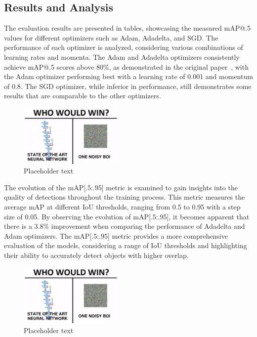 \documentclass[a4paper,12pt]{article}
\begin{document}
\begin{multicols}{2}
\section{Results and Analysis}

The evaluation results are presented in tables, showcasing the measured mAP@.5 values for different optimizers such as Adam, Adadelta, and SGD. The performance of each optimizer is analyzed, considering various combinations of learning rates and momenta. The Adam and Adadelta optimizers consistently achieve mAP@.5 scores above 80\%, as demonstrated in the original paper~\cite{MVDTHME}, with the Adam optimizer performing best with a learning rate of 0.001 and momentum of 0.8. The SGD optimizer, while inferior in performance, still demonstrates some results that are comparable to the other optimizers.
\begin{figure}[H]
    \centering
    \includegraphics[width=0.45\textwidth]{placeholder.png}
    \caption{Placeholder text}
    \label{}
\end{figure}

The evolution of the mAP[.5:.95] metric is examined to gain insights into the quality of detections throughout the training process. This metric measures the average mAP at different IoU thresholds, ranging from 0.5 to 0.95 with a step size of 0.05. By observing the evolution of mAP[.5:.95], it becomes apparent that there is a 3.8\% improvement when comparing the performance of Adadelta and Adam optimizers. The mAP[.5:.95] metric provides a more comprehensive evaluation of the models, considering a range of IoU thresholds and highlighting their ability to accurately detect objects with higher overlap.

\begin{figure}[H]
    \centering
    \includegraphics[width=0.45\textwidth]{placeholder.png}
    \caption{Placeholder text}
    \label{}
\end{figure}



\end{multicols}
\end{document}
